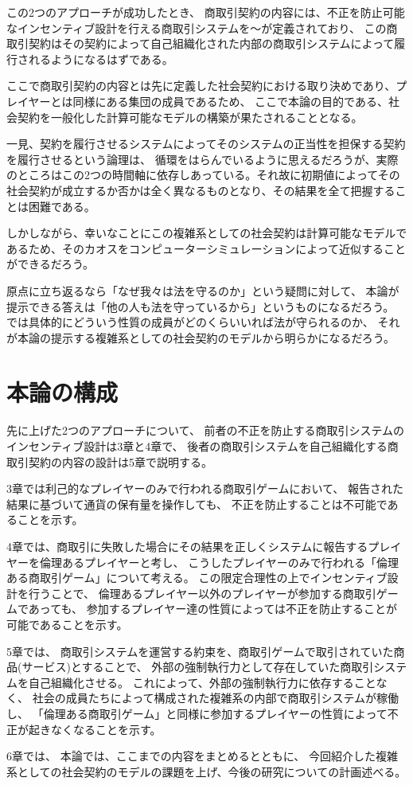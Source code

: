   この2つのアプローチが成功したとき、
  商取引契約の内容には、不正を防止可能なインセンティブ設計を行える商取引システムを〜が定義されており、
  この商取引契約はその契約によって自己組織化された内部の商取引システムによって履行されるようになるはずである。

  ここで商取引契約の内容とは先に定義した社会契約における取り決めであり、プレイヤーとは同様にある集団の成員であるため、
  ここで本論の目的である、社会契約を一般化した計算可能なモデルの構築が果たされることとなる。

  一見、契約を履行させるシステムによってそのシステムの正当性を担保する契約を履行させるという論理は、
  循環をはらんでいるように思えるだろうが、実際のところはこの2つの時間軸に依存しあっている。それ故に初期値によってその社会契約が成立するか否かは全く異なるものとなり、その結果を全て把握することは困難である。
 
  しかしながら、幸いなことにこの複雑系としての社会契約は計算可能なモデルであるため、そのカオスをコンピューターシミュレーションによって近似することができるだろう。

  原点に立ち返るなら「なぜ我々は法を守るのか」という疑問に対して、
  本論が提示できる答えは「他の人も法を守っているから」というものになるだろう。
  では具体的にどういう性質の成員がどのくらいいれば法が守られるのか、
  それが本論の提示する複雑系としての社会契約のモデルから明らかになるだろう。

  \section{本論の構成}
  先に上げた2つのアプローチについて、
  前者の不正を防止する商取引システムのインセンティブ設計は3章と4章で、
  後者の商取引システムを自己組織化する商取引契約の内容の設計は5章で説明する。

  3章では利己的なプレイヤーのみで行われる商取引ゲームにおいて、
  報告された結果に基づいて通貨の保有量を操作しても、
  不正を防止することは不可能であることを示す。

  4章では、商取引に失敗した場合にその結果を正しくシステムに報告するプレイヤーを倫理あるプレイヤーと考し、
  こうしたプレイヤーのみで行われる「倫理ある商取引ゲーム」について考える。
  この限定合理性の上でインセンティブ設計を行うことで、
  倫理あるプレイヤー以外のプレイヤーが参加する商取引ゲームであっても、
  参加するプレイヤー達の性質によっては不正を防止することが可能であることを示す。

  5章では、
  商取引システムを運営する約束を、商取引ゲームで取引されていた商品(サービス)とすることで、
  外部の強制執行力として存在していた商取引システムを自己組織化させる。
  これによって、外部の強制執行力に依存することなく、
  社会の成員たちによって構成された複雑系の内部で商取引システムが稼働し、
  「倫理ある商取引ゲーム」と同様に参加するプレイヤーの性質によって不正が起きなくなることを示す。
  
  6章では、
  本論では、ここまでの内容をまとめるとともに、
  今回紹介した複雑系としての社会契約のモデルの課題を上げ、今後の研究についての計画述べる。

